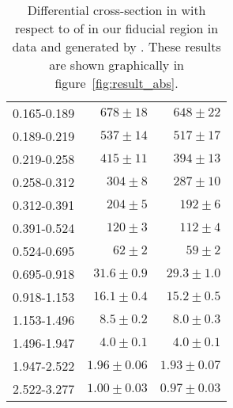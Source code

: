 \begin{table}
\begin{center}
\begin{tabular}{@{}l r r@{}}
            0.165-0.189  &  $678   \pm  18$    &  $648   \pm  22$    \\
            0.189-0.219  &  $537   \pm  14$    &  $517   \pm  17$    \\
            0.219-0.258  &  $415   \pm  11$    &  $394   \pm  13$    \\
            0.258-0.312  &  $304   \pm  8$     &  $287   \pm  10$    \\
            0.312-0.391  &  $204   \pm  5$     &  $192   \pm  6$     \\
            0.391-0.524  &  $120   \pm  3$     &  $112   \pm  4$     \\
            0.524-0.695  &  $62    \pm  2$     &  $59    \pm  2$     \\
            0.695-0.918  &  $31.6  \pm  0.9$   &  $29.3  \pm  1.0$   \\
            0.918-1.153  &  $16.1  \pm  0.4$   &  $15.2  \pm  0.5$   \\
            1.153-1.496  &  $8.5   \pm  0.2$   &  $8.0   \pm  0.3$   \\
            1.496-1.947  &  $4.0   \pm  0.1$   &  $4.0   \pm  0.1$   \\
            1.947-2.522  &  $1.96  \pm  0.06$  &  $1.93  \pm  0.07$  \\
            2.522-3.277  &  $1.00  \pm  0.03$  &  $0.97  \pm  0.03$  \\
            \bottomrule
        \end{tabular}
    \end{center}
    \caption[
        Differential cross-section in \pb with respect to \phistar of \Ztoee.
    ]{
        Differential cross-section in \pb with respect to \phistar of \Ztoee in our
        fiducial region in data and generated by \MADGRAPH. These results are shown
        graphically in figure~\ref{fig:result_abs}.
    }
    \label{tab:results_abs}
\end{table}
